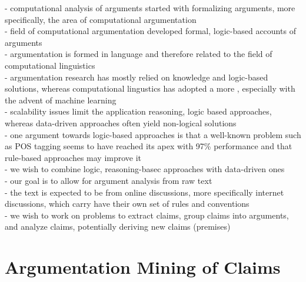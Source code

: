 
\noindent - computational analysis of arguments started with formalizing arguments, more
specifically, the area of computational argumentation \\
- field of computational argumentation developed formal, logic-based 
accounts of arguments \\
- argumentation is formed in language and therefore related to the field
of computational linguistics \\
- argumentation research has mostly relied on knowledge and 
logic-based solutions, whereas computational lingustics has adopted a 
more , especially with the advent of machine learning \\
- scalability issues limit the application reasoning, logic based
approaches, whereas data-driven approaches often yield non-logical
solutions \\
- one argument towards logic-based approaches 
is that a well-known problem such as POS tagging seems to have reached its
apex with 97\% performance and that rule-based approaches may improve it 
\citep{manning2011part} \\
- we wish to combine logic, reasoning-basec approaches with data-driven ones \\

\noindent - our goal is to allow for argument analysis from raw text \\
- the text is expected to be from online discussions, more specifically internet 
discussions, which carry have their own set of rules and conventions \\
- we wish to work on problems to extract claims, group claims into arguments, and analyze 
claims, potentially deriving new claims (premises) \\


\section{Argumentation Mining of Claims}

